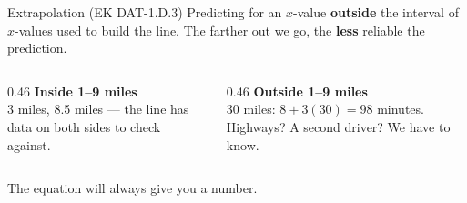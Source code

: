 \documentclass[aspectratio=169, 11pt]{beamer}
\begin{document}
\begin{frame}[t, plain]
  \vspace{10pt}
  \begin{block}{Extrapolation (EK DAT-1.D.3)}
    Predicting for an $x$-value \textbf{outside} the interval of $x$-values used to build the
    line. The farther out we go, the \textbf{less} reliable the prediction.
  \end{block}
  \vspace{8pt}
  \begin{columns}[t]
    \begin{column}{0.46\textwidth}
      \textbf{\color{navy}Inside 1--9 miles}\\[3pt]
      3 miles, 8.5 miles --- the line has data on both sides to check against.
    \end{column}
    \begin{column}{0.46\textwidth}
      \textbf{\color{navy}Outside 1--9 miles}\\[3pt]
      30 miles: $8 + 3(30) = 98$ minutes. Highways? A second driver? We have
       to know.
    \end{column}
  \end{columns}
  \vspace{12pt}
  \begin{center}
    {\large The equation will always give you a number. }
  \end{center}
\end{frame}
\end{document}
